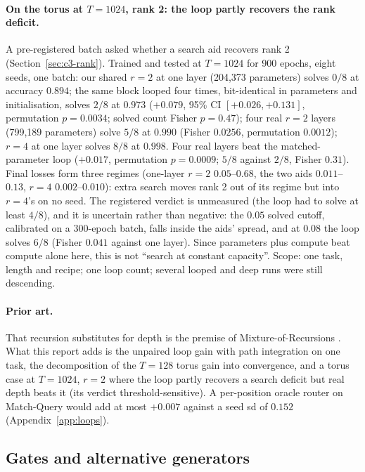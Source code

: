 \documentclass[10pt]{article}
\begin{document}
\paragraph{On the torus at $T=1024$, rank 2: the loop partly recovers the rank deficit.} A pre-registered
batch asked whether a search aid recovers rank 2 (Section~\ref{sec:c3-rank}). Trained and tested at $T=1024$
for 900 epochs, eight seeds, one batch: our shared $r=2$ at one layer (204,373 parameters) solves $0/8$ at
accuracy $0.894$; the same block looped four times, bit-identical in parameters and initialisation, solves
$2/8$ at $0.973$ ($+0.079$, 95\% CI $[+0.026,+0.131]$, permutation $p=0.0034$; solved count Fisher $p=0.47$);
four real $r=2$ layers (799,189 parameters) solve $5/8$ at $0.990$ (Fisher $0.0256$, permutation $0.0012$);
$r=4$ at one layer solves $8/8$ at $0.998$. Four real layers beat the matched-parameter loop ($+0.017$,
permutation $p=0.0009$; $5/8$ against $2/8$, Fisher $0.31$). Final losses form three regimes (one-layer $r=2$
$0.05$--$0.68$, the two aids $0.011$--$0.13$, $r=4$ $0.002$--$0.010$): extra search moves rank 2 out of its
regime but into $r=4$'s on no seed. The registered verdict is unmeasured (the loop had to solve at least
$4/8$), and it is uncertain rather than negative: the $0.05$ solved cutoff, calibrated on a 300-epoch batch,
falls inside the aids' spread, and at $0.08$ the loop solves $6/8$ (Fisher $0.041$ against one layer). Since
parameters plus compute beat compute alone here, this is not ``search at constant capacity''. Scope: one task,
length and recipe; one loop count; several looped and deep runs were still descending.

\paragraph{Prior art.} That recursion substitutes for depth is the premise of Mixture-of-Recursions
\citep{bae2025mor}. What this report adds is the unpaired loop gain with path integration on one task, the
decomposition of the $T=128$ torus gain into convergence, and a torus case at $T=1024$, $r=2$ where the loop
partly recovers a search deficit but real depth beats it (its verdict threshold-sensitive). A per-position oracle router on Match-Query would add
at most $+0.007$ against a seed sd of $0.152$ (Appendix~\ref{app:loops}). %

\subsection{Gates and alternative generators}
\label{sec:c5-gates}
\end{document}
